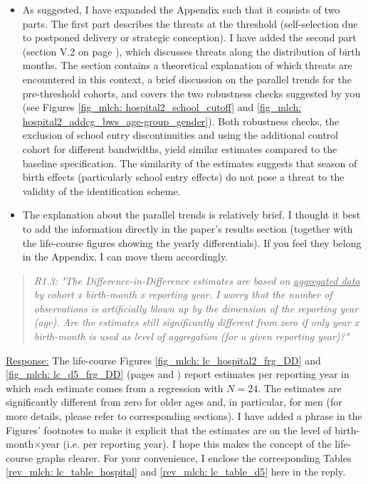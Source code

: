 \begin{itemize}
	\item As suggested, I have expanded the Appendix such that it consists of two parts. The first part describes the threats at the threshold (self-selection due to postponed delivery or strategic conception). I have added the second part (section V.2 on page \pageref{rev_mlch:threats_birth_months}), which discusses threats along the distribution of birth months. The section contains a theoretical explanation of which threats are encountered in this context, a brief discussion on the parallel trends for the pre-threshold cohorts, and covers the two robustness checks suggested by you (see Figures \ref{fig_mlch: hospital2_school_cutoff} and \ref{fig_mlch: hospital2_addcg_bws_age-group_gender}). Both robustness checks, the exclusion of school entry discontinuities and using the additional control cohort for different bandwidths, yield similar estimates compared to the baseline specification. The similarity of the estimates suggests that season of birth effects (particularly school entry effects) do not pose a threat to the validity of the identification scheme.
	\item The explanation about the parallel trends is relatively brief. I thought it best to add the information directly in the paper's results section (together with the life-course figures showing the yearly differentials). If you feel they belong in the Appendix, I can move them accordingly.
\end{itemize}


\bigskip
{}
\begin{quote}
	\textit{R1.3: "The Difference-in-Difference estimates are based on \underline{aggregated data} by cohort x birth-month x reporting year. I worry that the number of observations is artificially blown up by the dimension of the reporting year (age). Are the estimates still significantly different from zero if only year x birth-month is used as level of aggregation (for a given reporting year)?"}
\end{quote}
\underline{Response:} The life-course Figures \ref{fig_mlch: lc_hospital2_frg_DD} and \ref{fig_mlch: lc_d5_frg_DD} (pages \pageref{fig_mlch: lc_hospital2_frg_DD} and \pageref{fig_mlch: lc_d5_frg_DD}) report estimates per reporting year in which each estimate comes from a regression with $N=24$. The estimates are significantly different from zero for older ages and, in particular, for men (for more details, please refer to corresponding sections). I have added a phrase in the Figures' footnotes to make it explicit that the estimates are on the level of birth-month$\times$year (i.e. per reporting year). I hope this makes the concept of the life-course graphs clearer. For your convenience, I enclose the corresponding Tables \ref{rev_mlch: lc_table_hospital} and \ref{rev_mlch: lc_table_d5} here in the reply.


